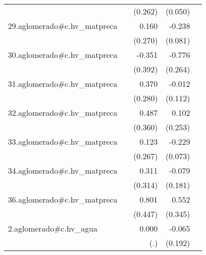 {\begin{longtable}{l*{4}{D{.}{.}{-1}}}
            &                     &     (0.262)         &     (0.050)         &                     \\
\addlinespace
29.aglomerado#c.hv\_matpreca&                     &       0.160         &      -0.238\sym{**} &                     \\
            &                     &     (0.270)         &     (0.081)         &                     \\
\addlinespace
30.aglomerado#c.hv\_matpreca&                     &      -0.351         &      -0.776\sym{**} &                     \\
            &                     &     (0.392)         &     (0.264)         &                     \\
\addlinespace
31.aglomerado#c.hv\_matpreca&                     &       0.370         &      -0.012         &                     \\
            &                     &     (0.280)         &     (0.112)         &                     \\
\addlinespace
32.aglomerado#c.hv\_matpreca&                     &       0.487         &       0.102         &                     \\
            &                     &     (0.360)         &     (0.253)         &                     \\
\addlinespace
33.aglomerado#c.hv\_matpreca&                     &       0.123         &      -0.229\sym{**} &                     \\
            &                     &     (0.267)         &     (0.073)         &                     \\
\addlinespace
34.aglomerado#c.hv\_matpreca&                     &       0.311         &      -0.079         &                     \\
            &                     &     (0.314)         &     (0.181)         &                     \\
\addlinespace
36.aglomerado#c.hv\_matpreca&                     &       0.801         &       0.552         &                     \\
            &                     &     (0.447)         &     (0.345)         &                     \\
\addlinespace
2.aglomerado#c.hv\_agua&                     &       0.000         &      -0.065         &                     \\
            &                     &         (.)         &     (0.192)         &                     \\

\end{longtable}}
